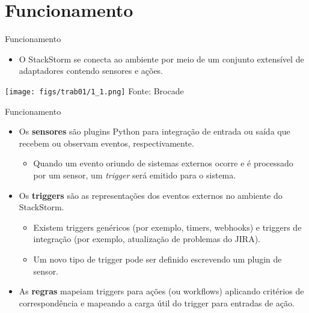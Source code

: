 \documentclass[t,serif]{beamer}
\begin{document}
\section{Funcionamento}
	\begin{frame}{Funcionamento}
		\begin{itemize}
			\item O StackStorm se conecta ao ambiente por meio de um conjunto extensível de adaptadores contendo sensores e ações.
		\end{itemize}
		\vspace{0.5cm}
		\begin{center}
			\texttt{[image: figs/trab01/1\_1.png]}
			{\small Fonte: Brocade}
		\end{center}
	\end{frame}
	
	\begin{frame}{Funcionamento}
		\begin{itemize}
			\item Os \textbf{sensores} são plugins Python para integração de entrada ou saída que recebem ou observam eventos, respectivamente. 
			\begin{itemize}
				\item Quando um evento oriundo de sistemas externos ocorre e é processado por um sensor, um \textit{trigger} será emitido para o sistema.
			\end{itemize}
			\item Os \textbf{triggers} são as representações dos eventos externos no ambiente do StackStorm.
			\begin{itemize}
				\item Existem triggers genéricos (por exemplo, timers, webhooks) e triggers de integração (por exemplo, atualização de problemas do JIRA).
				\item Um novo tipo de trigger pode ser definido escrevendo um plugin de sensor.
			\end{itemize}
			\item As \textbf{regras} mapeiam triggers para ações (ou workflows) aplicando critérios de correspondência e mapeando a carga útil do trigger para entradas de ação.
		\end{itemize}
	\end{frame}
	
\end{document}
